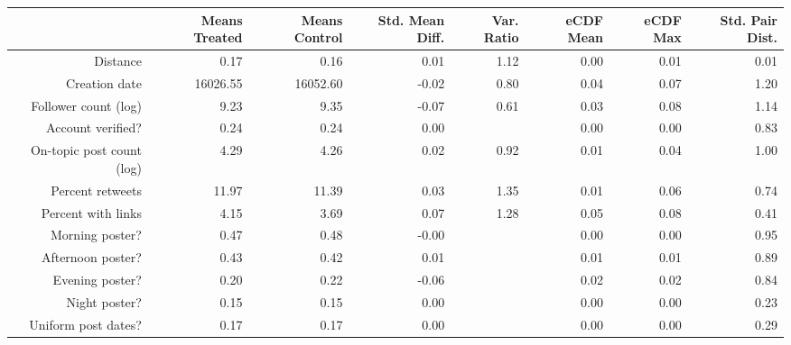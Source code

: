 \begin{table}[ht]
\centering
\begin{tabular}{rrrrrrrr}
  & Means Treated & Means Control & Std. Mean Diff. & Var. Ratio & eCDF Mean & eCDF Max & Std. Pair Dist. \\ 
  \hline
Distance & 0.17 & 0.16 & 0.01 & 1.12 & 0.00 & 0.01 & 0.01 \\ 
   \hline
Creation date & 16026.55 & 16052.60 & -0.02 & 0.80 & 0.04 & 0.07 & 1.20 \\ 
   \hline
Follower count (log) & 9.23 & 9.35 & -0.07 & 0.61 & 0.03 & 0.08 & 1.14 \\ 
   \hline
Account verified? & 0.24 & 0.24 & 0.00 &  & 0.00 & 0.00 & 0.83 \\ 
   \hline
On-topic post count (log) & 4.29 & 4.26 & 0.02 & 0.92 & 0.01 & 0.04 & 1.00 \\ 
   \hline
Percent retweets & 11.97 & 11.39 & 0.03 & 1.35 & 0.01 & 0.06 & 0.74 \\ 
   \hline
Percent with links & 4.15 & 3.69 & 0.07 & 1.28 & 0.05 & 0.08 & 0.41 \\ 
   \hline
Morning poster? & 0.47 & 0.48 & -0.00 &  & 0.00 & 0.00 & 0.95 \\ 
   \hline
Afternoon poster? & 0.43 & 0.42 & 0.01 &  & 0.01 & 0.01 & 0.89 \\ 
   \hline
Evening poster? & 0.20 & 0.22 & -0.06 &  & 0.02 & 0.02 & 0.84 \\ 
   \hline
Night poster? & 0.15 & 0.15 & 0.00 &  & 0.00 & 0.00 & 0.23 \\ 
   \hline
Uniform post dates? & 0.17 & 0.17 & 0.00 &  & 0.00 & 0.00 & 0.29 \\ 
   \hline
\end{tabular}
\end{table}
